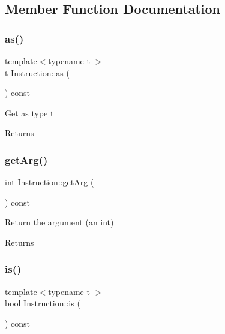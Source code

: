 \subsection{Member Function Documentation}
\mbox{\label{class_instruction_ac99272000afeb9015a9d40ceed8c139b}} 
\subsubsection{\texorpdfstring{as()}{as()}}
{\footnotesize\ttfamily template$<$typename t $>$ \\
t Instruction\+::as (\begin{DoxyParamCaption}{ }\end{DoxyParamCaption}) const\hspace{0.3cm}{\ttfamily [inline]}}

Get as type t \begin{DoxyReturn}{Returns}

\end{DoxyReturn}
\mbox{\label{class_instruction_a83a2763aa1dab5281b27dd99925f683e}} 
\subsubsection{\texorpdfstring{get\+Arg()}{getArg()}}
{\footnotesize\ttfamily int Instruction\+::get\+Arg (\begin{DoxyParamCaption}{ }\end{DoxyParamCaption}) const\hspace{0.3cm}{\ttfamily [inline]}}

Return the argument (an int) \begin{DoxyReturn}{Returns}

\end{DoxyReturn}
\mbox{\label{class_instruction_ade73e12471250fd191362d462e2f4970}} 
\subsubsection{\texorpdfstring{is()}{is()}}
{\footnotesize\ttfamily template$<$typename t $>$ \\
bool Instruction\+::is (\begin{DoxyParamCaption}{ }\end{DoxyParamCaption}) const\hspace{0.3cm}{\ttfamily [inline]}}

